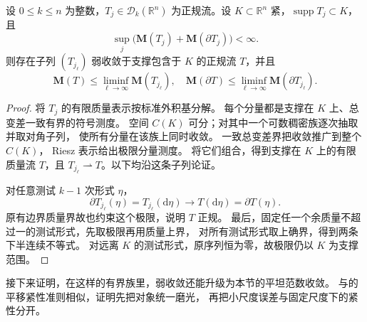 \begin{proposition}\label{b1:prop:app-d-normal-weak-compactness}
设 \(0\le k\le n\) 为整数，\(T_j\in\mathcal D_k(\mathbb R^n)\) 为正规流。设 \(K\subset\mathbb R^n\) 紧，\(\operatorname{supp}T_j\subset K\)，且
\[
 \sup_j\bigl(\mathbf M(T_j)+\mathbf M(\partial T_j)\bigr)<\infty.
\]
则存在子列 \((T_{j_\ell})\) 弱收敛于支撑包含于 \(K\) 的正规流 \(T\)，并且
\[
 \mathbf M(T)\leq\liminf_{\ell\to\infty}\mathbf M(T_{j_\ell}),\quad
 \mathbf M(\partial T)\leq\liminf_{\ell\to\infty}\mathbf M(\partial T_{j_\ell}).
\]
\end{proposition}
\begin{proof}
将 \(T_j\) 的有限质量表示按标准外积基分解。
每个分量都是支撑在 \(K\) 上、总变差一致有界的符号测度。
空间 \(C(K)\) 可分；对其中一个可数稠密族逐次抽取并取对角子列，
使所有分量在该族上同时收敛。
一致总变差界把收敛推广到整个 \(C(K)\)，
Riesz 表示给出极限分量测度。
将它们组合，得到支撑在 \(K\) 上的有限质量流 \(T\)，且 \(T_{j_\ell}\rightharpoonup T\)。以下均沿这条子列论证。

对任意测试 \(k-1\) 次形式 \(\eta\)，
\[
 \partial T_{j_\ell}(\eta)=T_{j_\ell}(\mathrm{d}\eta)\longrightarrow T(\mathrm{d}\eta)=\partial T(\eta).
\]
原有边界质量界故也约束这个极限，说明 \(T\) 正规。
最后，固定任一个余质量不超过一的测试形式，先取极限再用质量上界，
对所有测试形式取上确界，得到两条下半连续不等式。
对远离 \(K\) 的测试形式，原序列恒为零，故极限仍以 \(K\) 为支撑范围。
\end{proof}

接下来证明，在这样的有界族里，弱收敛还能升级为本节的平坦范数收敛。
与的平移紧性准则相似，证明先把对象统一磨光，
再把小尺度误差与固定尺度下的紧性分开。


